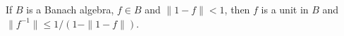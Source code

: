 If $B$ is a Banach algebra, $f \in B$ and $\|1 - f\| < 1$, then $f$ is a unit in $B$ and $\|f^{-1}\| \leqslant 1/(1 - \|1 - f\|)$.
